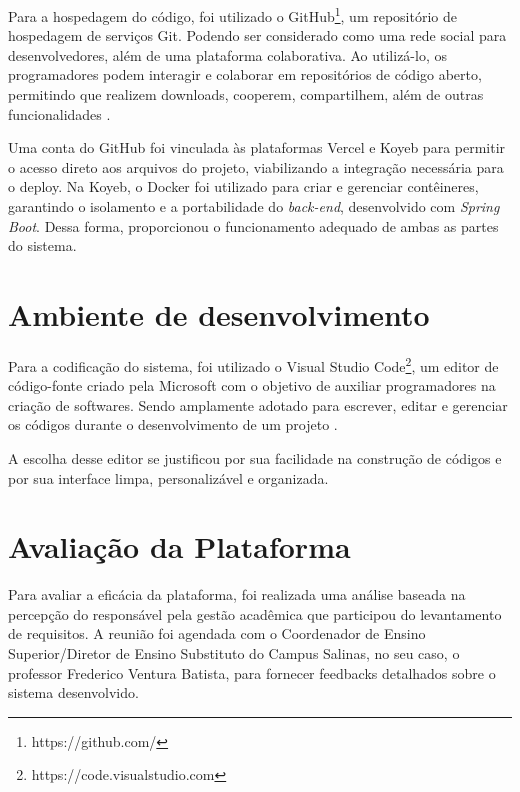 Para a hospedagem do código, foi utilizado o GitHub\footnote{https://github.com/}, um repositório de hospedagem de serviços Git. Podendo ser considerado como uma rede social para desenvolvedores, além de uma plataforma colaborativa. Ao utilizá-lo, os programadores podem interagir e colaborar em repositórios de código aberto, permitindo que realizem downloads, cooperem, compartilhem, além de outras funcionalidades \cite{silva2024biblioteca}.

Uma conta do GitHub foi vinculada às plataformas Vercel e Koyeb para permitir o acesso direto aos arquivos do projeto, viabilizando a integração necessária para o deploy. Na Koyeb, o Docker foi utilizado para criar e gerenciar contêineres, garantindo o isolamento e a portabilidade do \textit{back-end}, desenvolvido com \textit{Spring Boot}. Dessa forma, proporcionou o funcionamento adequado de ambas as partes do sistema.

\section{Ambiente de desenvolvimento}

Para a codificação do sistema, foi utilizado o Visual Studio Code\footnote{https://code.visualstudio.com}, um editor de código-fonte criado pela Microsoft com o objetivo de auxiliar programadores na criação de softwares. Sendo amplamente adotado para escrever, editar e gerenciar os códigos durante o desenvolvimento de um projeto \cite{silva2024biblioteca}.

A escolha desse editor se justificou por sua facilidade na construção de códigos e por sua interface limpa, personalizável e organizada.

\section{Avaliação da Plataforma}

Para avaliar a eficácia da plataforma, foi realizada uma análise baseada na percepção do responsável pela gestão acadêmica que participou do levantamento de requisitos. A reunião foi agendada com o Coordenador de Ensino Superior/Diretor de Ensino Substituto do Campus Salinas, no seu caso, o professor Frederico Ventura Batista, para fornecer feedbacks detalhados sobre o sistema desenvolvido.

